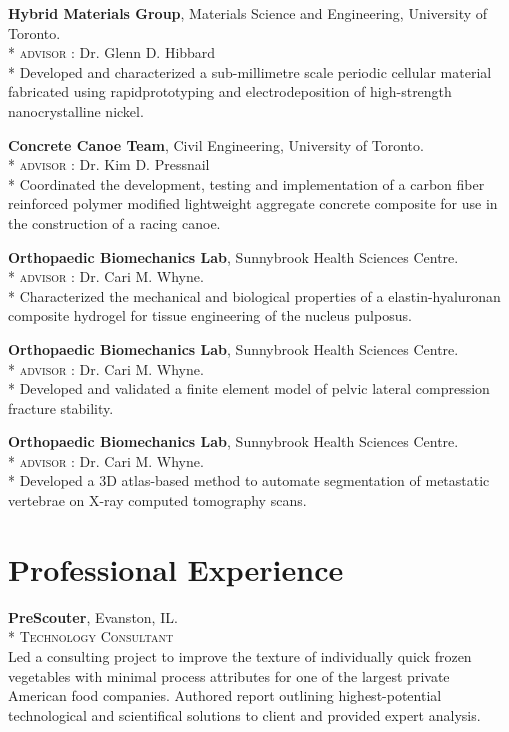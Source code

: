 \textbf{Hybrid Materials Group}, Materials Science and Engineering, University of Toronto.\\*
\textsc{advisor} : Dr. Glenn D. Hibbard\\*
Developed and characterized a sub-millimetre scale periodic cellular material fabricated using rapidprototyping and electrodeposition of high-strength nanocrystalline nickel.

\textbf{Concrete Canoe Team}, Civil Engineering, University of Toronto.\\*
\textsc{advisor} : Dr. Kim D. Pressnail\\*
Coordinated the development, testing and implementation of a carbon fiber reinforced polymer modified lightweight aggregate concrete composite for use in the construction of a racing canoe.

\textbf{Orthopaedic Biomechanics Lab}, Sunnybrook Health Sciences Centre.\\*
\textsc{advisor} : Dr. Cari M. Whyne.\\*
Characterized the mechanical and biological properties of a elastin-hyaluronan composite hydrogel for tissue engineering of the nucleus pulposus.

\textbf{Orthopaedic Biomechanics Lab}, Sunnybrook Health Sciences Centre.\\*
\textsc{advisor} : Dr. Cari M. Whyne.\\*
Developed and validated a finite element model of pelvic lateral compression fracture stability.

\textbf{Orthopaedic Biomechanics Lab}, Sunnybrook Health Sciences Centre.\\*
\textsc{advisor} : Dr. Cari M. Whyne.\\*
Developed a 3D atlas-based method to automate segmentation of metastatic vertebrae on X-ray computed tomography scans.
\endgroup

\section*{Professional Experience}
\textbf{PreScouter}, Evanston, IL.\\*
\begingroup\setlength{\parskip}{0.2cm}
\textsc{Technology Consultant}\\
Led a consulting project to improve the texture of individually quick frozen vegetables with minimal process attributes for one of the largest private American food companies. Authored report outlining highest-potential technological and scientifical solutions to client and provided expert analysis.


